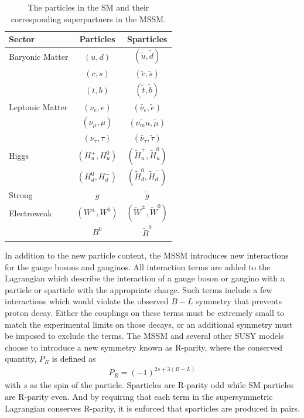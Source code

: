 \begin{table}
\centering
\begin{tabular}{lcc}
\hline
Sector & Particles & Sparticles \\
\hline
Baryonic Matter & $(u,d)$ & $(\tilde{u},\tilde{d})$ \\
                & $(c,s)$ & $(\tilde{c},\tilde{s})$ \\
                & $(t,b)$ & $(\tilde{t},\tilde{b})$ \\
Leptonic Matter & $(\nu_e,e)$ & $(\tilde{\nu_e},\tilde{e})$ \\
                & $(\nu_\mu,\mu)$ & $(\tilde{\nu_mu},\tilde{\mu})$ \\
                & $(\nu_\tau,\tau)$ & $(\tilde{\nu_\tau},\tilde{\tau})$ \\
Higgs           & $(H_u^+, H_u^0)$ & $(\tilde{H}_u^+, \tilde{H}_u^0)$ \\
                & $(H_d^0, H_d^-)$ & $(\tilde{H}_d^0, \tilde{H}_d^-)$ \\
Strong          & $g$ & $\tilde{g}$ \\
Electroweak     & $(W^\pm, W^0)$ & $(\tilde{W}^\pm, \tilde{W}^0)$ \\
                & $B^0$ & $\tilde{B}^0$ \\
\end{tabular}
\caption{The particles in the \ac{SM} and their corresponding superpartners in the \ac{MSSM}.}
\label{tab:sparticles}
\end{table}


In addition to the new particle content, the \ac{MSSM} introduces new interactions for the gauge bosons and gauginos.
All interaction terms are added to the Lagrangian which describe the interaction of a gauge boson or gaugino with a particle or sparticle with the appropriate charge.
Such terms include a few interactions which would violate the observed $B - L$ symmetry that prevents proton decay.
Either the couplings on these terms must be extremely small to match the experimental limits on those decays, or an additional symmetry must be imposed to exclude the terms.
The \ac{MSSM} and several other \ac{SUSY} models choose to introduce a new symmetry known as R-parity, where the conserved quantity, $P_R$ is defined as
\begin{align*}
P_R = (-1)^{2s + 3(B-L)}
\end{align*}
with $s$ as the spin of the particle.
Sparticles are R-parity odd while \ac{SM} particles are R-parity even.
And by requiring that each term in the supersymmetric Lagrangian conserves R-parity, it is enforced that sparticles are produced in pairs.


